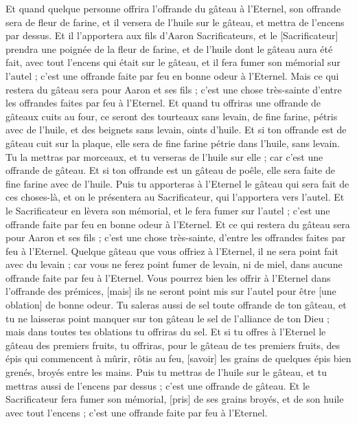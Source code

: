 \begin{multicols}{2}
\VerseOne{}Et quand quelque personne offrira l'offrande du gâteau à l'Eternel, son offrande sera de fleur de farine, et il versera de l'huile sur le gâteau, et mettra de l'encens par dessus.
Et il l'apportera aux fils d'Aaron Sacrificateurs, et le [Sacrificateur] prendra une poignée de la fleur de farine, et de l'huile dont le gâteau aura été fait, avec tout l'encens qui était sur le gâteau, et il fera fumer son mémorial sur l'autel ; c'est une offrande faite par feu en bonne odeur à l'Eternel.
Mais ce qui restera du gâteau sera pour Aaron et ses fils ; c'est une chose très-sainte d'entre les offrandes faites par feu à l'Eternel.
Et quand tu offriras une offrande de gâteaux cuits au four, ce seront des tourteaux sans levain, de fine farine, pétris avec de l'huile, et des beignets sans levain, oints d'huile.
Et si ton offrande est de gâteau cuit sur la plaque, elle sera de fine farine pétrie dans l'huile, sans levain.
Tu la mettras par morceaux, et tu verseras de l'huile sur elle ; car c'est une offrande de gâteau.
Et si ton offrande est un gâteau de poêle, elle sera faite de fine farine avec de l'huile.
Puis tu apporteras à l'Eternel le gâteau qui sera fait de ces choses-là, et on le présentera au Sacrificateur, qui l'apportera vers l'autel.
Et le Sacrificateur en lèvera son mémorial, et le fera fumer sur l'autel ; c'est une offrande faite par feu en bonne odeur à l'Eternel.
Et ce qui restera du gâteau sera pour Aaron et ses fils ; c'est une chose très-sainte, d'entre les offrandes faites par feu à l'Eternel.
Quelque gâteau que vous offriez à l'Eternel, il ne sera point fait avec du levain ; car vous ne ferez point fumer de levain, ni de miel, dans aucune offrande faite par feu à l'Eternel.
Vous pourrez bien les offrir à l'Eternel dans l'offrande des prémices, [mais] ils ne seront point mis sur l'autel pour être [une oblation] de bonne odeur.
Tu saleras aussi de sel toute offrande de ton gâteau, et tu ne laisseras point manquer sur ton gâteau le sel de l'alliance de ton Dieu ; mais dans toutes tes oblations tu offriras du sel.
Et si tu offres à l'Eternel le gâteau des premiers fruits, tu offriras, pour le gâteau de tes premiers fruits, des épis qui commencent à mûrir, rôtis au feu, [savoir] les grains de quelques épis bien grenés, broyés entre les mains.
Puis tu mettras de l'huile sur le gâteau, et tu mettras aussi de l'encens par dessus ; c'est une offrande de gâteau.
Et le Sacrificateur fera fumer son mémorial, [pris] de ses grains broyés, et de son huile avec tout l'encens ; c'est une offrande faite par feu à l'Eternel.

\end{multicols}
